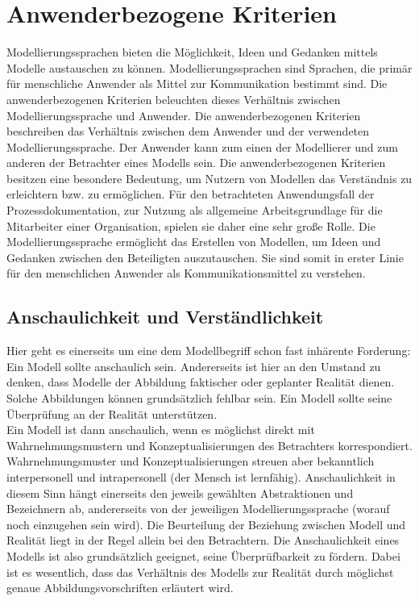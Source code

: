 \section{Anwenderbezogene Kriterien}
Modellierungssprachen bieten die Möglichkeit, Ideen und Gedanken mittels Modelle austauschen zu
können. Modellierungssprachen sind Sprachen, die primär für menschliche Anwender als Mittel zur
Kommunikation bestimmt sind. Die anwenderbezogenen Kriterien beleuchten dieses Verhältnis zwischen
Modellierungssprache und Anwender.
Die anwenderbezogenen Kriterien beschreiben das Verhältnis zwischen dem Anwender und der verwendeten Modellierungssprache. Der Anwender kann zum einen der Modellierer und zum anderen der Betrachter eines Modells sein. Die anwenderbezogenen Kriterien besitzen eine besondere Bedeutung, um Nutzern von Modellen das Verständnis zu erleichtern bzw. zu ermöglichen. Für den betrachteten Anwendungsfall der Prozessdokumentation, zur Nutzung als allgemeine Arbeitsgrundlage für die Mitarbeiter einer Organisation, spielen sie daher eine sehr große Rolle. Die Modellierungssprache ermöglicht das Erstellen von Modellen, um Ideen und Gedanken zwischen den Beteiligten auszutauschen. Sie sind somit in erster Linie für den menschlichen Anwender als Kommunikationsmittel zu verstehen.  
\subsection{Anschaulichkeit und Verständlichkeit}
Hier geht es einerseits um eine dem Modellbegriff schon fast inhärente Forderung: Ein Modell sollte
anschaulich sein. Andererseits ist hier an den Umstand zu denken, dass Modelle der Abbildung faktischer
oder geplanter Realität dienen. Solche Abbildungen können grundsätzlich fehlbar sein. Ein
Modell sollte seine Überprüfung an der Realität unterstützen. \\

Ein Modell ist dann anschaulich, wenn es möglichst direkt mit Wahrnehmungsmustern und Konzeptualisierungen
des Betrachters korrespondiert. Wahrnehmungsmuster und Konzeptualisierungen
streuen aber bekanntlich interpersonell und intrapersonell (der Mensch ist lernfähig). Anschaulichkeit
in diesem Sinn hängt einerseits den jeweils gewählten Abstraktionen und Bezeichnern ab, andererseits
von der jeweiligen Modellierungssprache (worauf noch einzugehen sein wird). Die Beurteilung der
Beziehung zwischen Modell und Realität liegt in der Regel allein bei den Betrachtern. Die Anschaulichkeit
eines Modells ist also grundsätzlich geeignet, seine Überprüfbarkeit zu fördern. Dabei ist es wesentlich,
dass das Verhältnis des Modells zur Realität durch möglichst genaue Abbildungsvorschriften
erläutert wird. \\
